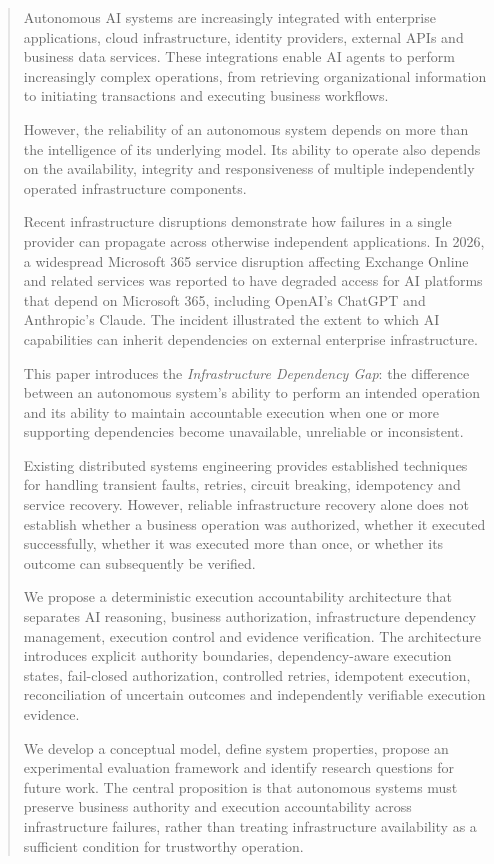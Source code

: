 \documentclass[11pt,a4paper]{article}
\begin{document}
\begin{abstract}
Autonomous AI systems are increasingly integrated with enterprise applications, cloud infrastructure, identity providers, external APIs and business data services. These integrations enable AI agents to perform increasingly complex operations, from retrieving organizational information to initiating transactions and executing business workflows.

However, the reliability of an autonomous system depends on more than the intelligence of its underlying model. Its ability to operate also depends on the availability, integrity and responsiveness of multiple independently operated infrastructure components.

Recent infrastructure disruptions demonstrate how failures in a single provider can propagate across otherwise independent applications. In 2026, a widespread Microsoft 365 service disruption affecting Exchange Online and related services was reported to have degraded access for AI platforms that depend on Microsoft 365, including OpenAI's ChatGPT and Anthropic's Claude. The incident illustrated the extent to which AI capabilities can inherit dependencies on external enterprise infrastructure.

This paper introduces the \emph{Infrastructure Dependency Gap}: the difference between an autonomous system's ability to perform an intended operation and its ability to maintain accountable execution when one or more supporting dependencies become unavailable, unreliable or inconsistent.

Existing distributed systems engineering provides established techniques for handling transient faults, retries, circuit breaking, idempotency and service recovery. However, reliable infrastructure recovery alone does not establish whether a business operation was authorized, whether it executed successfully, whether it was executed more than once, or whether its outcome can subsequently be verified.

We propose a deterministic execution accountability architecture that separates AI reasoning, business authorization, infrastructure dependency management, execution control and evidence verification. The architecture introduces explicit authority boundaries, dependency-aware execution states, fail-closed authorization, controlled retries, idempotent execution, reconciliation of uncertain outcomes and independently verifiable execution evidence.

We develop a conceptual model, define system properties, propose an experimental evaluation framework and identify research questions for future work. The central proposition is that autonomous systems must preserve business authority and execution accountability across infrastructure failures, rather than treating infrastructure availability as a sufficient condition for trustworthy operation.
\end{abstract}
\end{document}
